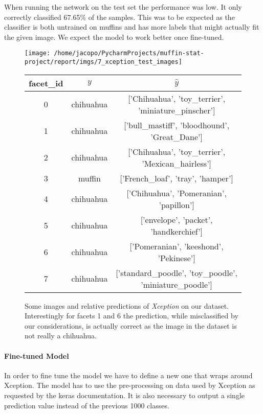 When running the network on the test set the performance was low.
It only correctly classified 67.65\% of the samples.
This was to be expected as the classifier is both untrained on muffins and has more labels that might actually fit the given image.
We expect the model to work better once fine-tuned.

\begin{figure}
    \centering

    \texttt{[image: /home/jacopo/PycharmProjects/muffin-stat-project/report/imgs/7\_xception\_test\_images]}
    \begin{tabular}{ | c | c | c | }
        \hline
        facet\_id & $y$       & $\hat{y}$                                                \\
        \hline\hline
        0         & chihuahua & ['Chihuahua', 'toy\_terrier', 'miniature\_pinscher']     \\
        \hline
        1         & chihuahua & ['bull\_mastiff', 'bloodhound', 'Great\_Dane']           \\
        \hline
        2         & chihuahua & ['Chihuahua', 'toy\_terrier', 'Mexican\_hairless']       \\
        \hline
        3         & muffin    & ['French\_loaf', 'tray', 'hamper']                       \\
        \hline
        4         & chihuahua & ['Chihuahua', 'Pomeranian', 'papillon']                  \\
        \hline
        5         & chihuahua & ['envelope', 'packet', 'handkerchief']                   \\
        \hline
        6         & chihuahua & ['Pomeranian', 'keeshond', 'Pekinese']                   \\
        \hline
        7         & chihuahua & ['standard\_poodle', 'toy\_poodle', 'miniature\_poodle'] \\
        \hline
    \end{tabular}


    \caption{Some images and relative predictions of \textit{Xception} on our dataset.\\
    Interestingly for facets 1 and 6 the prediction, while misclassified by our considerations, is actually correct
    as the image in the dataset is not really a chihuahua.
    }
    \label{fig:7_xception_test}
\end{figure}



\paragraph{Fine-tuned Model}
In order to fine tune the model we have to define a new one that wraps around Xception.
The model has to use the pre-processing on data used by Xception as requested by the keras documentation.
It is also necessary to output a single prediction value instead of the previous 1000 classes.


